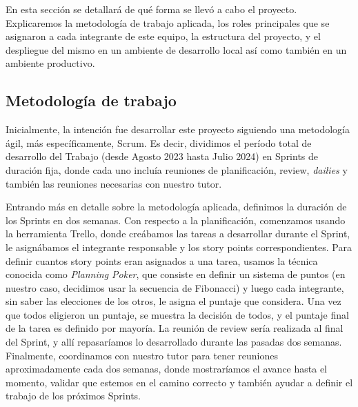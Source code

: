 
\noindent En esta sección se detallará de qué forma se llevó a cabo el proyecto. Explicaremos la metodología de trabajo
aplicada, los roles principales que se asignaron a cada integrante de este equipo, la estructura del proyecto, y el despliegue del mismo
en un ambiente de desarrollo local así como también en un ambiente productivo.

\subsection{Metodología de trabajo}

\noindent Inicialmente, la intención fue desarrollar este proyecto siguiendo una metodología ágil, más específicamente, Scrum.
Es decir, dividimos el período total de desarrollo del Trabajo (desde Agosto 2023 hasta Julio 2024) en Sprints de duración fija,
donde cada uno incluía reuniones de planificación, review, \textit{dailies} y también las reuniones necesarias con nuestro tutor.

Entrando más en detalle sobre la metodología aplicada, definimos la duración de los Sprints en dos semanas. Con respecto a
la planificación, comenzamos usando la herramienta Trello, donde creábamos las tareas a desarrollar durante el Sprint, le asignábamos
el integrante responsable y los story points correspondientes. Para definir cuantos story points eran asignados a una tarea, usamos la
técnica conocida como \textit{Planning Poker}, que consiste en definir un sistema de puntos (en nuestro caso, decidimos usar la secuencia
de Fibonacci) y luego cada integrante, sin saber las elecciones de los otros, le asigna el puntaje que considera. Una vez que todos
eligieron un puntaje, se muestra la decisión de todos, y el puntaje final de la tarea es definido por mayoría. La reunión de review sería
realizada al final del Sprint, y allí repasaríamos lo desarrollado durante las pasadas dos semanas. Finalmente, coordinamos con nuestro tutor para tener reuniones aproximadamente cada dos semanas, donde mostraríamos el avance hasta el momento,
validar que estemos en el camino correcto y también ayudar a definir el trabajo de los próximos Sprints.

